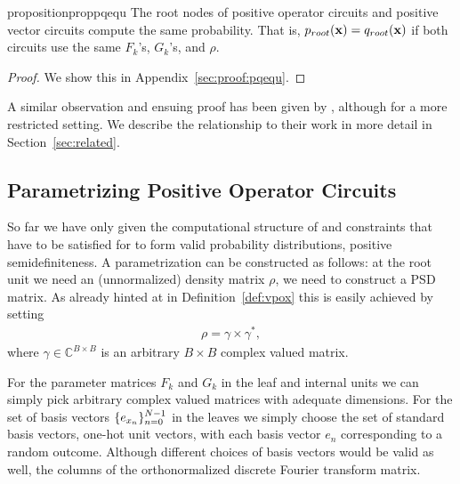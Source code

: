 \begin{restatable}{proposition}{proppqequ}
	\label{prop:pqequ}
	The root nodes of positive operator circuits and positive vector circuits compute the same probability. That is,
	$p_{root}(\mathbf{x})=q_{root}(\mathbf{x})$ if both circuits use the same $F_k$'s, $G_k$'s, and $\rho$.
\end{restatable}
\begin{proof}
	We show this in Appendix~\ref{sec:proof:pqequ}.
\end{proof}

A similar observation and ensuing proof has been given by \citet{loconte2024subtractive}, although for a more restricted setting. We describe the relationship to their work in more detail in Section~\ref{sec:related}.










\subsection{Parametrizing Positive Operator Circuits}

So far we have only given the computational structure of \pocs and constraints that have to be satisfied for \pocs to form valid probability distributions, \eg positive semidefiniteness. A parametrization can be constructed as follows: at the root unit we need an (unnormalized) density matrix $\rho$, \ie we need to construct a PSD matrix. As already hinted at in Definition~\ref{def:vpox} this is easily achieved by setting
\begin{align}
	\rho = \gamma \times  \gamma^* ,
\end{align}
where $\gamma \in \mathbb{C}^{B\times B}$ is an arbitrary $B\times B$ complex valued matrix.

For the parameter matrices $F_k$ and $G_k$ in the leaf and internal units we can simply pick arbitrary complex valued matrices with adequate dimensions.
For the set of  basis vectors $\{e_{x_n} \}_{n=0}^{N-1}$ in the leaves we simply choose the set of standard basis vectors, \ie one-hot unit vectors, with each basis vector $e_n$ corresponding to a random outcome. Although different choices of basis vectors would be valid as well, \eg the columns of the orthonormalized discrete Fourier transform matrix.


